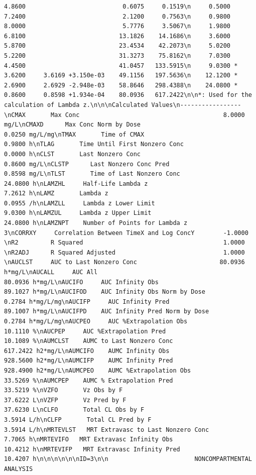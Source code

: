 \documentclass[12pt,]{krantz}
\theoremstyle{definition}
\theoremstyle{definition}
\theoremstyle{definition}
\theoremstyle{remark}
\begin{document}
\begin{verbatim}
4.8600                           0.6075     0.1519\n     0.5000       7.2400                           2.1200     0.7563\n     0.9800       8.0000                           5.7776     3.5067\n     1.9800       6.8100                          13.1826    14.1686\n     3.6000       5.8700                          23.4534    42.2073\n     5.0200       5.2200                          31.3273    75.8162\n     7.0300       4.4500                          41.0457   133.5915\n     9.0300 *     3.6200     3.6169 +3.150e-03    49.1156   197.5636\n    12.1200 *     2.6900     2.6929 -2.948e-03    58.8646   298.4388\n    24.0800 *     0.8600     0.8598 +1.934e-04    80.0936   617.2422\n\n*: Used for the calculation of Lambda z.\n\n\nCalculated Values\n-----------------\nCMAX       Max Conc                                        8.0000 mg/L\nCMAXD      Max Conc Norm by Dose                           0.0250 mg/L/mg\nTMAX       Time of CMAX                                    0.9800 h\nTLAG       Time Until First Nonzero Conc                   0.0000 h\nCLST       Last Nonzero Conc                               0.8600 mg/L\nCLSTP      Last Nonzero Conc Pred                          0.8598 mg/L\nTLST       Time of Last Nonzero Conc                      24.0800 h\nLAMZHL     Half-Life Lambda z                              7.2612 h\nLAMZ       Lambda z                                        0.0955 /h\nLAMZLL     Lambda z Lower Limit                            9.0300 h\nLAMZUL     Lambda z Upper Limit                           24.0800 h\nLAMZNPT    Number of Points for Lambda z                   3\nCORRXY     Correlation Between TimeX and Log ConcY        -1.0000 \nR2         R Squared                                       1.0000 \nR2ADJ      R Squared Adjusted                              1.0000 \nAUCLST     AUC to Last Nonzero Conc                       80.0936 h*mg/L\nAUCALL     AUC All                                        80.0936 h*mg/L\nAUCIFO     AUC Infinity Obs                               89.1027 h*mg/L\nAUCIFOD    AUC Infinity Obs Norm by Dose                   0.2784 h*mg/L/mg\nAUCIFP     AUC Infinity Pred                              89.1007 h*mg/L\nAUCIFPD    AUC Infinity Pred Norm by Dose                  0.2784 h*mg/L/mg\nAUCPEO     AUC %Extrapolation Obs                         10.1110 %\nAUCPEP     AUC %Extrapolation Pred                        10.1089 %\nAUMCLST    AUMC to Last Nonzero Conc                     617.2422 h2*mg/L\nAUMCIFO    AUMC Infinity Obs                             928.5600 h2*mg/L\nAUMCIFP    AUMC Infinity Pred                            928.4900 h2*mg/L\nAUMCPEO    AUMC %Extrapolation Obs                        33.5269 %\nAUMCPEP    AUMC % Extrapolation Pred                      33.5219 %\nVZFO       Vz Obs by F                                    37.6222 L\nVZFP       Vz Pred by F                                   37.6230 L\nCLFO       Total CL Obs by F                               3.5914 L/h\nCLFP       Total CL Pred by F                              3.5914 L/h\nMRTEVLST   MRT Extravasc to Last Nonzero Conc              7.7065 h\nMRTEVIFO   MRT Extravasc Infinity Obs                     10.4212 h\nMRTEVIFP   MRT Extravasc Infinity Pred                    10.4207 h\n\n\n\n\n\nID=3\n\n                        NONCOMPARTMENTAL ANALYSIS 
\end{verbatim}
\end{document}
